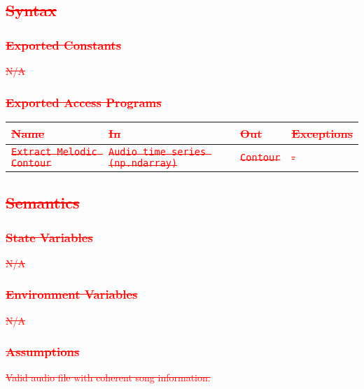 \documentclass[12pt, titlepage]{article}
\begin{document}
\subsection{\textcolor{red}{\sout{Syntax}}}

\subsubsection{\textcolor{red}{\sout{Exported Constants}}}
\textcolor{red}{\sout{N/A}}

\subsubsection{\textcolor{red}{\sout{Exported Access Programs}}}

\begin{center}
\begin{tabular}{p{2cm} p{4cm} p{4cm} p{2cm}}
\hline
\textcolor{red}{\sout{\textbf{Name}}} & \textcolor{red}{\sout{\textbf{In}}} & \textcolor{red}{\sout{\textbf{Out}}} & \textcolor{red}{\sout{\textbf{Exceptions}}}\\
\hline
\textcolor{red}{\sout{\texttt{Extract Melodic Contour}}} & \textcolor{red}{\sout{\texttt{Audio time series (np.ndarray)}}} & \textcolor{red}{\sout{\texttt{Contour}}} & \textcolor{red}{\sout{-}}\\
\hline
\end{tabular}
\end{center}

\subsection{\textcolor{red}{\sout{Semantics}}}

\subsubsection{\textcolor{red}{\sout{State Variables}}}
\textcolor{red}{\sout{N/A}}

\subsubsection{\textcolor{red}{\sout{Environment Variables}}}
\textcolor{red}{\sout{N/A}}

\subsubsection{\textcolor{red}{\sout{Assumptions}}}
\textcolor{red}{\sout{Valid audio file with coherent song information.}}
\end{document}
